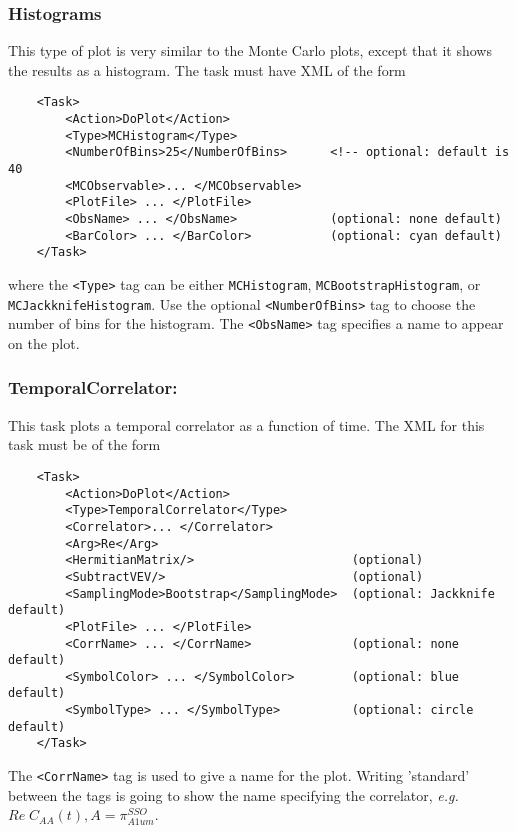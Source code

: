 \documentclass[12pt]{article}
\newcommand{\vb}{\texttt}
\begin{document}
\subsubsection{Histograms}
This type of plot is very similar to the Monte Carlo plots, except that it shows the results
as a histogram. The task must have XML of the form
\begin{verbatim}
    <Task>
        <Action>DoPlot</Action>
        <Type>MCHistogram</Type>
        <NumberOfBins>25</NumberOfBins>      <!-- optional: default is 40
        <MCObservable>... </MCObservable>
        <PlotFile> ... </PlotFile>
        <ObsName> ... </ObsName>             (optional: none default)
        <BarColor> ... </BarColor>           (optional: cyan default)
    </Task>
\end{verbatim}
where the \vb{<Type>} tag can be either \vb{MCHistogram}, \vb{MCBootstrapHistogram}, or
\vb{MCJackknifeHistogram}. Use the optional \vb{<NumberOfBins>} tag to
choose the number of bins for the histogram.
The \vb{<ObsName>} tag specifies a name to appear on the plot.

\subsubsection{TemporalCorrelator:}

This task plots a temporal correlator as a function of time. The XML for this task must be of the form
\begin{verbatim}
    <Task>
        <Action>DoPlot</Action>
        <Type>TemporalCorrelator</Type>
        <Correlator>... </Correlator>
        <Arg>Re</Arg>
        <HermitianMatrix/>                      (optional)
        <SubtractVEV/>                          (optional)
        <SamplingMode>Bootstrap</SamplingMode>  (optional: Jackknife default)
        <PlotFile> ... </PlotFile>
        <CorrName> ... </CorrName>              (optional: none default)
        <SymbolColor> ... </SymbolColor>        (optional: blue default)
        <SymbolType> ... </SymbolType>          (optional: circle default)
    </Task> 
\end{verbatim}
The \vb{<CorrName>} tag is used to give a name for the plot.
Writing 'standard' between the tags is going to show the name specifying the correlator, 
\textit{e.g.} $Re \; C_{AA}(t), A = \pi_{A1um}^{SSO}$.
\end{document}
